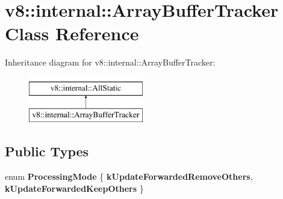 \hypertarget{classv8_1_1internal_1_1ArrayBufferTracker}{}\section{v8\+:\+:internal\+:\+:Array\+Buffer\+Tracker Class Reference}
\label{classv8_1_1internal_1_1ArrayBufferTracker}
Inheritance diagram for v8\+:\+:internal\+:\+:Array\+Buffer\+Tracker\+:\begin{figure}[H]
\begin{center}
\leavevmode
\includegraphics[height=2.000000cm]{classv8_1_1internal_1_1ArrayBufferTracker}
\end{center}
\end{figure}
\subsection*{Public Types}
\begin{DoxyCompactItemize}
\item 
\mbox{\label{classv8_1_1internal_1_1ArrayBufferTracker_a42a006a522afd397aa293242f5d1fc55}} 
enum {\bfseries Processing\+Mode} \{ {\bfseries k\+Update\+Forwarded\+Remove\+Others}, 
{\bfseries k\+Update\+Forwarded\+Keep\+Others}
 \}
\end{DoxyCompactItemize}
